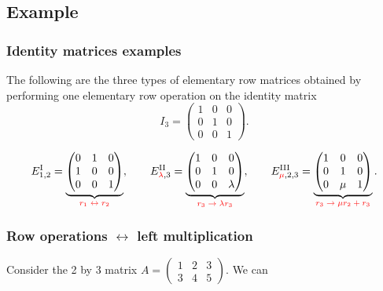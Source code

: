 \documentclass[12pt]{article}
\begin{document}
\subsection{Example}

\subsubsection{Identity matrices examples}

The following are the three types of elementary row matrices obtained by
performing one elementary row operation on the identity matrix
\[
I_3=
\begin{pmatrix}
1&0&0\\
0&1&0\\
0&0&1
\end{pmatrix}.
\]


\[
E^{\mathrm{I}}_{1,2}=
\underbrace{
\begin{pmatrix}
0&1&0\\
1&0&0\\
0&0&1
\end{pmatrix}}_{\textcolor{red}{\text{$r_1 \leftrightarrow r_2$}}},
\qquad
E^{\mathrm{II}}_{\textcolor{red}{\lambda},3}=
\underbrace{
\begin{pmatrix}
1&0&0\\
0&1&0\\
0&0&\lambda
\end{pmatrix}}_{\textcolor{red}{\text{$r_3 \rightarrow \lambda r_3$}}},
\qquad
E^{\mathrm{III}}_{\textcolor{red}{\mu},2,3}=
\underbrace{
\begin{pmatrix}
1&0&0\\
0&1&0\\
0&\mu&1
\end{pmatrix}}_{\textcolor{red}{\text{$r_3 \rightarrow \mu r_2 + r_3$}}}.
\]

\subsubsection{Row operations $\leftrightarrow$ left multiplication}

Consider the 2 by 3 matrix
$A=
\begin{pmatrix}
1&2&3\\
3&4&5
\end{pmatrix}.
$
We can
\end{document}
